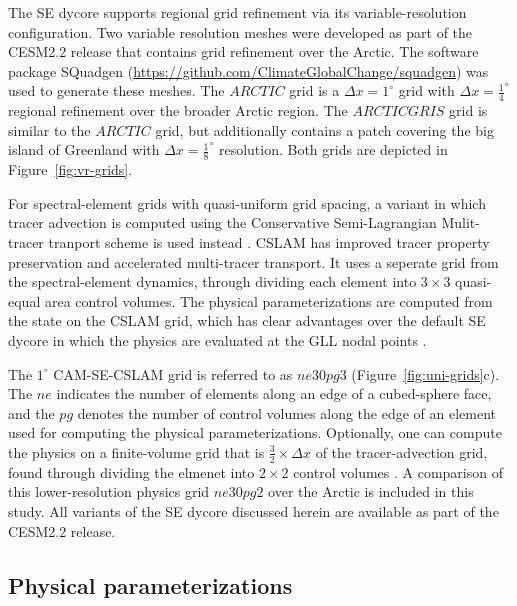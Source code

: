 \documentclass[draft]{agujournal2019}
\begin{document}
The SE dycore supports regional grid refinement via its variable-resolution configuration. Two variable resolution meshes were developed as part of the CESM2.2 release that contains grid refinement over the Arctic. The software package SQuadgen (\url{https://github.com/ClimateGlobalChange/squadgen}) was used to generate these meshes. The $ARCTIC$ grid is a $\Delta x=1^{\circ}$ grid with $\Delta x=\frac{1}{4}^{\circ}$ regional refinement over the broader Arctic region. The $ARCTICGRIS$ grid is similar to the $ARCTIC$ grid, but additionally contains a patch covering the big island of Greenland with $\Delta x=\frac{1}{8}^{\circ}$ resolution. Both grids are depicted in Figure~\ref{fig:vr-grids}.

For spectral-element grids with quasi-uniform grid spacing, a variant in which tracer advection is computed using the Conservative Semi-Lagrangian Mulit-tracer tranport scheme is used instead \cite[CSLAM]{LTOUNGK2017MWR}. CSLAM has improved tracer property preservation and accelerated multi-tracer transport. It uses a seperate grid from the spectral-element dynamics, through dividing each element into $3\times3$ quasi-equal area control volumes. The physical parameterizations are computed from the state on the CSLAM grid, which has clear advantages over the default SE dycore in which the physics are evaluated at the GLL nodal points \cite{HL2018MWR}. 

The $1^{\circ}$ CAM-SE-CSLAM grid is referred to as $ne30pg3$ (Figure~\ref{fig:uni-grids}c). The $ne$ indicates the number of elements along an edge of a cubed-sphere face, and the $pg$ denotes the number of control volumes along the edge of an element used for computing the physical parameterizations. Optionally, one can compute the physics on a finite-volume grid that is $\frac{3}{2} \times \Delta x$ of the tracer-advection grid, found through dividing the elmenet into $2\times2$ control volumes \cite[(Figure~\ref{fig:uni-grids}d)]{HETAL2019JAMES}. A comparison of this lower-resolution physics grid $ne30pg2$ over the Arctic is included in this study. All variants of the SE dycore discussed herein are available as part of the CESM2.2 release.

\subsection{Physical parameterizations}
\end{document}
